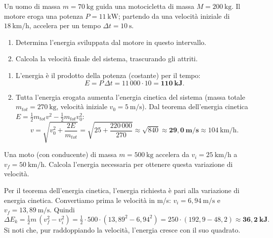 \begin{question}[ID=2.1, subtitle={Velocità finale di moto+uomo con potenza del motore}, tags={forze vive, energia, potenza}, difficulty=facile]
Un uomo di massa $m = 70\ \text{kg}$ guida una motocicletta di massa $M = 200\ \text{kg}$. Il motore eroga una potenza $P = 11\ \text{kW}$; partendo da una velocità iniziale di $18\ \text{km/h}$, accelera per un tempo $\Delta t = 10\ \text{s}$.
\begin{enumerate}
    \item Determina l'energia sviluppata dal motore in questo intervallo.
    \item Calcola la velocità finale del sistema, trascurando gli attriti.
\end{enumerate}
\begin{solution}
\begin{enumerate}
    \item L'energia è il prodotto della potenza (costante) per il tempo:
    \[
    E = P\,\Delta t = 11\,000\cdot 10 = \mathbf{110\ \text{kJ}}.
    \]
    \item Tutta l'energia erogata aumenta l'energia cinetica del sistema (massa totale $m_{tot} = 270\ \text{kg}$, velocità iniziale $v_0 = 5\ \text{m/s}$). Dal teorema dell'energia cinetica $E = \tfrac{1}{2}m_{tot}v^2 - \tfrac{1}{2}m_{tot}v_0^2$:
    \[
    v = \sqrt{v_0^2 + \frac{2E}{m_{tot}}} = \sqrt{25 + \frac{220\,000}{270}} \approx \sqrt{840} \approx \mathbf{29{,}0\ \text{m/s}} \approx 104\ \text{km/h}.
    \]
\end{enumerate}
\end{solution}
\end{question}


\begin{question}[ID=2.2, subtitle={Energia per accelerare una moto da 25 a 50 km/h}, tags={forze vive, energia}, difficulty=facile]
Una moto (con conducente) di massa $m = 500\ \text{kg}$ accelera da $v_i = 25\ \text{km/h}$ a $v_f = 50\ \text{km/h}$. Calcola l'energia necessaria per ottenere questa variazione di velocità.
\begin{solution}
Per il teorema dell'energia cinetica, l'energia richiesta è pari alla variazione di energia cinetica. Convertiamo prima le velocità in m/s: $v_i = 6{,}94\ \text{m/s}$ e $v_f = 13{,}89\ \text{m/s}$. Quindi
\[
\Delta E_k = \tfrac{1}{2}m\,(v_f^2 - v_i^2) = \tfrac{1}{2}\cdot 500\cdot(13{,}89^2 - 6{,}94^2) = 250\cdot(192{,}9 - 48{,}2) \approx \mathbf{36{,}2\ \text{kJ}}.
\]
Si noti che, pur raddoppiando la velocità, l'energia cresce con il suo quadrato.
\end{solution}
\end{question}

